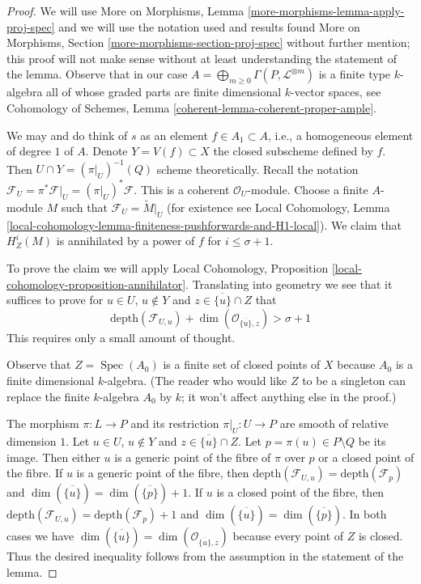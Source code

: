\documentclass{stacks-project}
\theoremstyle{plain}
\theoremstyle{definition}
\theoremstyle{remark}
\numberwithin{equation}{subsection}
\def\Spec{\mathop{\mathrm{Spec}}}
\begin{document}
\begin{proof}
We will use More on Morphisms, Lemma \ref{more-morphisms-lemma-apply-proj-spec}
and we will use the notation used and results found
More on Morphisms, Section \ref{more-morphisms-section-proj-spec}
without further mention; this proof will not make sense without
at least understanding the statement of the lemma.
Observe that in our case
$A = \bigoplus_{m \geq 0} \Gamma(P, \mathcal{L}^{\otimes m})$
is a finite type $k$-algebra
all of whose graded parts are finite dimensional $k$-vector spaces, see
Cohomology of Schemes, Lemma \ref{coherent-lemma-coherent-proper-ample}.

\medskip\noindent
We may and do think of $s$ as an element $f \in A_1 \subset A$, i.e.,
a homogeneous element of degree $1$ of $A$. Denote
$Y = V(f) \subset X$ the closed subscheme defined by $f$.
Then $U \cap Y = (\pi|_U)^{-1}(Q)$ scheme theoretically.
Recall the notation
$\mathcal{F}_U = \pi^*\mathcal{F}|_U = (\pi|_U)^*\mathcal{F}$.
This is a coherent $\mathcal{O}_U$-module.
Choose a finite $A$-module $M$ such that
$\mathcal{F}_U = \widetilde{M}|_U$
(for existence see Local Cohomology, Lemma
\ref{local-cohomology-lemma-finiteness-pushforwards-and-H1-local}).
We claim that $H^i_Z(M)$ is annihilated by
a power of $f$ for $i \leq \sigma + 1$.

\medskip\noindent
To prove the claim we will apply
Local Cohomology, Proposition \ref{local-cohomology-proposition-annihilator}.
Translating into geometry we see that it suffices to prove
for $u \in U$, $u \not \in Y$ and $z \in \overline{\{u\}} \cap Z$
that
$$
\text{depth}(\mathcal{F}_{U, u}) +
\dim(\mathcal{O}_{\overline{\{u\}}, z}) > \sigma + 1
$$
This requires only a small amount of thought.

\medskip\noindent
Observe that $Z = \Spec(A_0)$ is a finite set of closed points of $X$ because
$A_0$ is a finite dimensional $k$-algebra.
(The reader who would like $Z$ to be a singleton can replace the
finite $k$-algebra $A_0$ by $k$; it won't affect anything else in the proof.)

\medskip\noindent
The morphism $\pi : L \to P$ and its restriction $\pi|_U : U \to P$
are smooth of relative dimension $1$.
Let $u \in U$, $u \not \in Y$ and $z \in \overline{\{u\}} \cap Z$.
Let $p = \pi(u) \in P \setminus Q$ be its image.
Then either $u$ is a generic
point of the fibre of $\pi$ over $p$ or a closed point of the fibre.
If $u$ is a generic point of the fibre, then
$\text{depth}(\mathcal{F}_{U, u}) = \text{depth}(\mathcal{F}_p)$
and
$\dim(\overline{\{u\}}) = \dim(\overline{\{p\}}) + 1$.
If $u$ is a closed point of the fibre, then
$\text{depth}(\mathcal{F}_{U, u}) = \text{depth}(\mathcal{F}_p) + 1$
and
$\dim(\overline{\{u\}}) = \dim(\overline{\{p\}})$.
In both cases we have
$\dim(\overline{\{u\}}) = \dim(\mathcal{O}_{\overline{\{u\}}, z})$
because every point of $Z$ is closed. Thus the desired
inequality follows from the assumption in the statement of
the lemma.


\end{proof}
\end{document}
